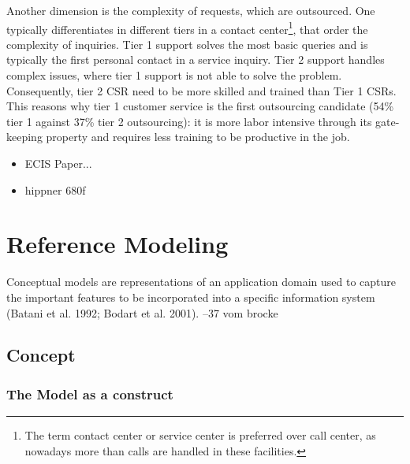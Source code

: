 		Another dimension is the complexity of requests, which are outsourced. One typically differentiates in different tiers in a contact center\footnote{The term contact center or service center is preferred over call center, as nowadays more than calls are handled in these facilities.}, that order the complexity of inquiries. Tier 1 support solves the most basic queries and is typically the first personal contact in a service inquiry. Tier 2 support handles complex issues, where tier 1 support is not able to solve the problem. Consequently, tier 2 \acrshort{CSR} need to be more skilled and trained than Tier 1  \acrshort{CSR}s. This reasons why tier 1 customer service is the first outsourcing candidate (54\% tier 1 against 37\% tier 2 outsourcing\cite{deloitte2014outsourcing}): it is more labor intensive through its gate-keeping property and requires less training to be productive in the job. 
		
		\begin{itemize}
			\item ECIS Paper...

			\item hippner 680f
		\end{itemize}
	\section{Reference Modeling}
	\label{sec:03_refmod}
		
Conceptual models are representations of an application domain used to capture the important features to be incorporated into a specific information system (Batani et al. 1992; Bodart et al. 2001). --37 vom brocke


		\subsection{Concept}
		
		\subsubsection{The Model as a construct}
		
